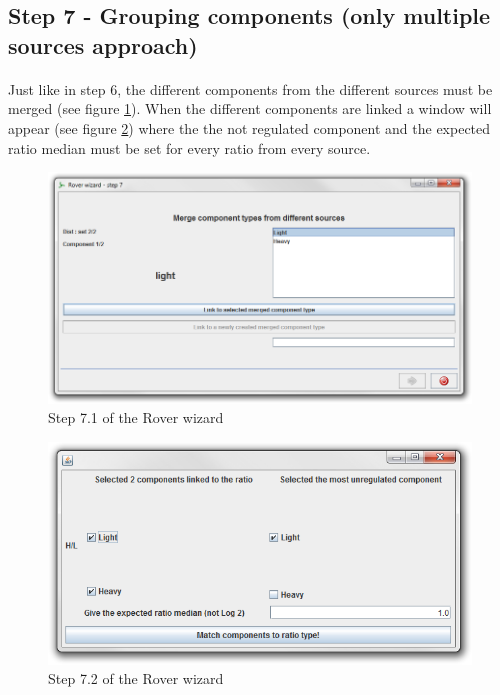 \documentclass[11pt,a4paper,oneside,notitlepage]{book}
\begin{document}
\subsection{Step 7 - Grouping components (only multiple sources approach)}
\paragraph{}Just like in step 6, the different components from the different sources must be merged (see figure \ref{step7}). When the different components are linked a window will appear (see figure \ref{step7_2}) where the the not regulated component and the expected ratio median must be set for every ratio from every source. 

\begin{figure}[H]
\begin{center}
\includegraphics[scale=0.4]{Rover_wizard_-_step_7.png}
\caption{Step 7.1 of the Rover wizard}
\label{step7}
\end{center}
\end{figure}

\begin{figure}[H]
\begin{center}
\includegraphics[scale=0.4]{matcher_S.png}
\caption{Step 7.2 of the Rover wizard}
\label{step7_2}
\end{center}
\end{figure}
\end{document}

